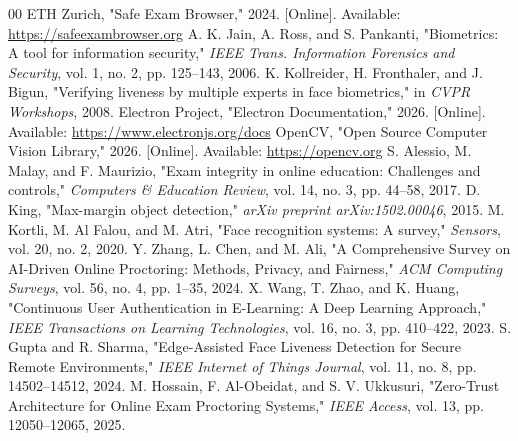 \documentclass[conference]{IEEEtran}
\begin{document}
\begin{thebibliography}{00}
 ETH Zurich, "Safe Exam Browser," 2024. [Online]. Available: \url{https://safeexambrowser.org}
 A. K. Jain, A. Ross, and S. Pankanti, "Biometrics: A tool for information security," \emph{IEEE Trans. Information Forensics and Security}, vol. 1, no. 2, pp. 125--143, 2006.
 K. Kollreider, H. Fronthaler, and J. Bigun, "Verifying liveness by multiple experts in face biometrics," in \emph{CVPR Workshops}, 2008.
 Electron Project, "Electron Documentation," 2026. [Online]. Available: \url{https://www.electronjs.org/docs}
 OpenCV, "Open Source Computer Vision Library," 2026. [Online]. Available: \url{https://opencv.org}
 S. Alessio, M. Malay, and F. Maurizio, "Exam integrity in online education: Challenges and controls," \emph{Computers \& Education Review}, vol. 14, no. 3, pp. 44--58, 2017.
 D. King, "Max-margin object detection," \emph{arXiv preprint arXiv:1502.00046}, 2015.
 M. Kortli, M. Al Falou, and M. Atri, "Face recognition systems: A survey," \emph{Sensors}, vol. 20, no. 2, 2020.
 Y. Zhang, L. Chen, and M. Ali, "A Comprehensive Survey on AI-Driven Online Proctoring: Methods, Privacy, and Fairness," \emph{ACM Computing Surveys}, vol. 56, no. 4, pp. 1--35, 2024.
 X. Wang, T. Zhao, and K. Huang, "Continuous User Authentication in E-Learning: A Deep Learning Approach," \emph{IEEE Transactions on Learning Technologies}, vol. 16, no. 3, pp. 410--422, 2023.
 S. Gupta and R. Sharma, "Edge-Assisted Face Liveness Detection for Secure Remote Environments," \emph{IEEE Internet of Things Journal}, vol. 11, no. 8, pp. 14502--14512, 2024.
 M. Hossain, F. Al-Obeidat, and S. V. Ukkusuri, "Zero-Trust Architecture for Online Exam Proctoring Systems," \emph{IEEE Access}, vol. 13, pp. 12050--12065, 2025.
\end{thebibliography}
\end{document}
